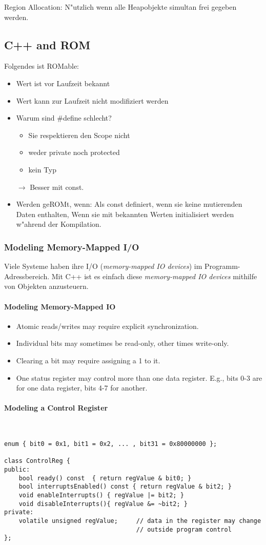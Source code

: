 Region Allocation: N"utzlich wenn alle Heapobjekte simultan frei gegeben werden. 

\subsection{C++ and ROM}
Folgendes ist ROMable: 
\begin{itemize}
\item Wert ist vor Laufzeit bekannt
\item Wert kann zur Laufzeit nicht modifiziert werden
\item Warum sind \#define schlecht?
	\begin{itemize}
		\item Sie respektieren den Scope nicht
		\item weder private noch protected
		\item kein Typ
	\end{itemize}
	$\rightarrow$ Besser mit const.
\item Werden geROMt, wenn: Als const definiert, wenn sie keine mutierenden
	Daten enthalten, Wenn sie mit bekannten Werten initialisiert werden
	w"ahrend der Kompilation.
\end{itemize}


\subsubsection{Modeling Memory-Mapped I/O}
Viele Systeme haben ihre I/O (\textit{memory-mapped IO devices}) im Programm-Adressbereich.
Mit C++ ist es einfach diese \textit{memory-mapped IO devices} mithilfe von Objekten anzusteuern.

\paragraph{Modeling Memory-Mapped IO}
\begin{itemize}
	\item Atomic reads/writes may require explicit synchronization.
	\item Individual bits may sometimes be read-only, other times write-only.
	\item Clearing a bit may require assigning a 1 to it.
	\item One status register may control more than one data register.
		E.g., bits 0-3 are for one data register, bits 4-7 for another.	
\end{itemize}

\paragraph{Modeling a Control Register}~
\begin{lstlisting}
enum { bit0 = 0x1, bit1 = 0x2, ... , bit31 = 0x80000000 };

class ControlReg {
public:
	bool ready() const 	{ return regValue & bit0; }
	bool interruptsEnabled() const { return regValue & bit2; }
	void enableInterrupts() { regValue |= bit2; }
	void disableInterrupts(){ regValue &= ~bit2; }
private:
	volatile unsigned regValue;		// data in the register may change
									// outside program control
};
\end{lstlisting}

